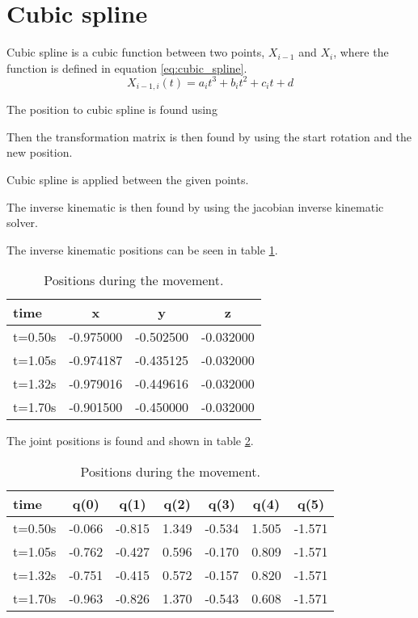 \section{Cubic spline}
Cubic spline is a cubic function between two points, \(X_{i-1}\) and \(X_i\), where the function is defined in equation \ref{eq:cubic_spline}.
\begin{equation}
 X_{i-1, i} (t) = a_i t^3 + b_i t^2 + c_i t + d
 \label{eq:cubic_spline}
\end{equation}

The position to cubic spline is found using \cite[equation 5.23]{book:roboticNotes}

Then the transformation matrix is then found by using the start rotation and the new position.


Cubic spline is applied between the given points.

The inverse kinematic is then found by using the jacobian inverse kinematic solver.

The inverse kinematic positions can be seen in table \ref{tb:positions}.

\begin{table}[h]
\centering
\begin{tabular}{l|*{3}{c} }
 time    & x         & y         & z         \\ \hline       
 t=0.50s & -0.975000 & -0.502500 & -0.032000 \\
 t=1.05s & -0.974187 & -0.435125 & -0.032000 \\
 t=1.32s & -0.979016 & -0.449616 & -0.032000 \\
 t=1.70s & -0.901500 & -0.450000 & -0.032000 \\
\end{tabular}
\caption{Positions during the movement.}
\label{tb:positions}
\end{table}

The joint positions is found and shown in table \ref{tb:joint_positions}.

\begin{table}[h]
\centering
\begin{tabular}{l|*{6}{c} }
 time    & q(0)   & q(1)   & q(2)  & q(3)   & q(4)  & q(5)   \\ \hline       
 t=0.50s & -0.066 & -0.815 & 1.349 & -0.534 & 1.505 & -1.571 \\
 t=1.05s & -0.762 & -0.427 & 0.596 & -0.170 & 0.809 & -1.571 \\
 t=1.32s & -0.751 & -0.415 & 0.572 & -0.157 & 0.820 & -1.571 \\
 t=1.70s & -0.963 & -0.826 & 1.370 & -0.543 & 0.608 & -1.571 \\
\end{tabular}
\caption{Positions during the movement.}
\label{tb:joint_positions}
\end{table}

